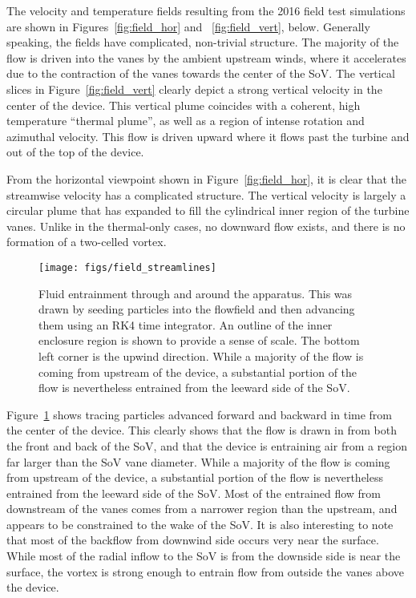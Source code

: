 The velocity and temperature fields resulting from the 2016 field test 
simulations are shown in Figures~\ref{fig:field_hor} and
~\ref{fig:field_vert}, below. Generally speaking, the fields have
complicated, non-trivial structure. The majority of the flow is driven
into the vanes by the ambient upstream winds, where it accelerates due
to the contraction of the vanes towards the center of the SoV.
The vertical slices in Figure~\ref{fig:field_vert} clearly depict a
strong vertical velocity in the center of the device. This vertical
plume coincides with a coherent, high temperature ``thermal plume'', as
well as a region of intense rotation and azimuthal velocity. This flow
is driven upward where it flows past the turbine and out of the top of
the device. 

From the horizontal viewpoint shown in Figure~\ref{fig:field_hor}, it is
clear that the streamwise velocity has a complicated structure. The
vertical velocity is largely a circular plume that has expanded to fill
the cylindrical inner region of the turbine vanes. Unlike in the
thermal-only cases, no downward flow exists, and there is no formation
of a two-celled vortex. 

\begin{figure}
  \centering
  \texttt{[image: figs/field\_streamlines]}
  \label{fig:field_stream}
 \caption{Fluid entrainment through and around the apparatus. This was
 drawn by seeding particles into the flowfield and then advancing them  
 using an RK4 time integrator. An outline of the inner enclosure region 
 is shown to provide a sense of scale. The bottom left corner is the
 upwind direction. While a majority of the flow is coming from upstream
 of the device, a substantial portion of the flow is nevertheless
 entrained from the leeward side of the SoV. }  
\end{figure}

Figure~\ref{fig:field_stream} shows tracing particles advanced forward
and backward in time from the center of the device. This clearly shows
that the flow is drawn in from both the front and back of the SoV, and
that the device is entraining air from a region far larger than the SoV
vane diameter.  While a majority of the flow is coming from upstream of
the device, a substantial portion of the flow is nevertheless  entrained
from the leeward side of the SoV. Most of the entrained flow from
downstream of the vanes comes from a narrower region than the upstream,
and appears to be constrained to the wake of the SoV. It is also
interesting to note that most of the backflow from downwind side occurs
very near the surface. While most of the radial inflow to the SoV is
from the downside side is near the surface, the vortex is strong enough
to entrain flow from outside the vanes above the device. 

